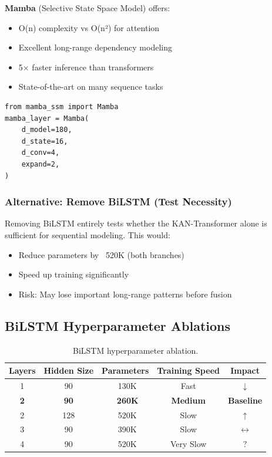 \documentclass[11pt,a4paper]{article}
\begin{document}
\textbf{Mamba} (Selective State Space Model) offers:
\begin{itemize}
    \item O(n) complexity vs O(n²) for attention
    \item Excellent long-range dependency modeling
    \item 5$\times$ faster inference than transformers
    \item State-of-the-art on many sequence tasks
\end{itemize}

\begin{verbatim}
from mamba_ssm import Mamba
mamba_layer = Mamba(
    d_model=180,
    d_state=16,
    d_conv=4,
    expand=2,
)
\end{verbatim}

\subsubsection{Alternative: Remove BiLSTM (Test Necessity)}

Removing BiLSTM entirely tests whether the KAN-Transformer alone is sufficient for sequential modeling. This would:
\begin{itemize}
    \item Reduce parameters by ~520K (both branches)
    \item Speed up training significantly
    \item Risk: May lose important long-range patterns before fusion
\end{itemize}

\subsection{BiLSTM Hyperparameter Ablations}

\begin{table}[H]
\centering
\begin{tabular}{ccccc}
\toprule
\textbf{Layers} & \textbf{Hidden Size} & \textbf{Parameters} & \textbf{Training Speed} & \textbf{Impact} \\
\midrule
1 & 90 & ~130K & Fast & \textcolor{negative}{$\downarrow$} \\
\rowcolor{lightgray}
\textbf{2} & \textbf{90} & \textbf{~260K} & \textbf{Medium} & \textbf{Baseline} \\
2 & 128 & ~520K & Slow & \textcolor{positive}{$\uparrow$} \\
3 & 90 & ~390K & Slow & \textcolor{neutral}{$\leftrightarrow$} \\
4 & 90 & ~520K & Very Slow & \textcolor{uncertain}{$?$} \\
\bottomrule
\end{tabular}
\caption{BiLSTM hyperparameter ablation.}
\end{table}
\end{document}
